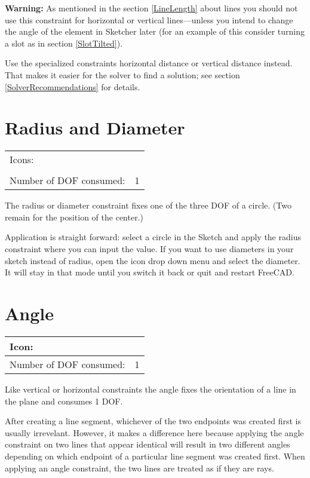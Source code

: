 \documentclass[12pt,titlepage]{article}
\newcommand{\icon}[1]{\raisebox{-1em}{\rule{0pt}{27pt}\texttt{[image: images/\#1]}}}
\newcommand{\dofConsumed}{Number of DOF consumed:}
\begin{document}
\begin {itemize}
{\bf Warning:} As mentioned in the section \vref{LineLength} about
lines you should not use this constraint for horizontal or vertical
lines---unless you intend to change the angle of the element in Sketcher
later (for an example of this consider turning a slot as in section
\vref{SlotTilted}).

Use the specialized constraints horizontal distance or vertical
distance instead. That makes it easier for the solver to find a
solution; see section \vref{SolverRecommendations} for details.

\section{Radius and Diameter}
\begin{tabular}{|l|l|}
\hline
Icons: & \icon{Constraint_Radius}\\
       & \icon{Constraint_Diameter}\\
\hline
\dofConsumed & 1 \\
\hline
\end{tabular}

The radius or diameter constraint fixes one of the three DOF of a circle. (Two
remain for the position of the center.)

Application is straight forward: select a circle in the Sketch and apply the radius
constraint where you can input the value. If you want to use diameters in your sketch instead of radius,
open the icon drop down menu and select the diameter. It will stay in that
mode until you switch it back or quit and restart FreeCAD.

\section{Angle}
\label{Angle}
\begin{tabular}{|l|l|}
\hline
Icon: & \icon{Constraint_InternalAngle}\\
\hline
\dofConsumed & 1 \\
\hline
\end{tabular}

Like vertical or horizontal constraints the angle fixes the orientation of a
line in the plane and consumes 1 DOF.

After creating a line segment, whichever of the two endpoints was created
first is usually irrevelant.  However, it makes a difference here because
applying the angle constraint on two lines that appear identical will result
in two different angles depending on which endpoint of a particular line
segment was created first.  When applying an angle constraint, the two lines
are treated as if they are rays.


\end{itemize}
\end{document}
